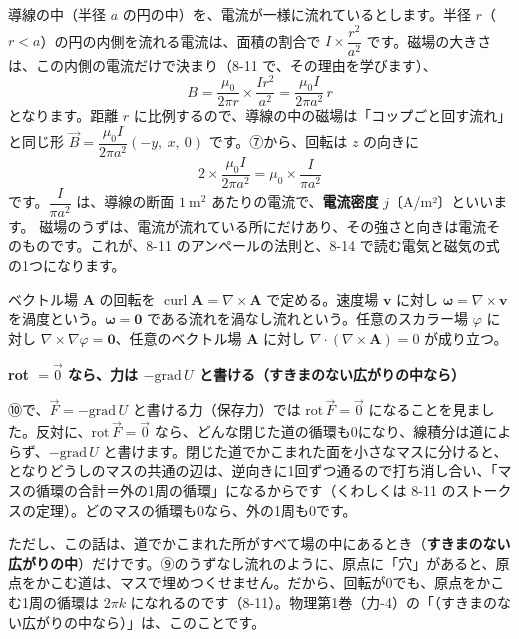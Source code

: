 導線の中（半径 $a$ の円の中）を、電流が一様に流れているとします。半径 $r$（$r<a$）の円の内側を流れる電流は、面積の割合で $I\times\dfrac{r^2}{a^2}$ です。磁場の大きさは、この内側の電流だけで決まり（8-11 で、その理由を学びます）、
\[ B=\frac{\mu_0}{2\pi r}\times\frac{Ir^2}{a^2}=\frac{\mu_0I}{2\pi a^2}\,r \]
となります。距離 $r$ に比例するので、導線の中の磁場は「コップごと回す流れ」と同じ形 $\vec B=\dfrac{\mu_0I}{2\pi a^2}(-y,\ x,\ 0)$ です。⑦から、回転は $z$ の向きに
\[ 2\times\frac{\mu_0I}{2\pi a^2}=\mu_0\times\frac{I}{\pi a^2} \]
です。$\dfrac{I}{\pi a^2}$ は、導線の断面 $1\ \text{m}^2$ あたりの電流で、\textbf{電流密度} $j$〔A/m²〕といいます。
磁場のうずは、電流が流れている所にだけあり、その強さと向きは電流そのものです。これが、8-11 のアンペールの法則と、8-14 で読む電気と磁気の式の1つになります。

\begin{senmonsho}
\begin{bkhonbun}
ベクトル場 $\symbf A$ の回転を $\operatorname{curl}\symbf A=\nabla\times\symbf A$ で定める。速度場 $\symbf v$ に対し $\symbf\omega=\nabla\times\symbf v$ を渦度という。$\symbf\omega=\symbf0$ である流れを渦なし流れという。任意のスカラー場 $\varphi$ に対し $\nabla\times\nabla\varphi=\symbf0$、任意のベクトル場 $\symbf A$ に対し $\nabla\cdot(\nabla\times\symbf A)=0$ が成り立つ。
\end{bkhonbun}
\end{senmonsho}

\begin{motto}[5]
\textbf{rot $=\vec0$ なら、力は $-\mathrm{grad}\,U$ と書ける（すきまのない広がりの中なら）}\par
⑩で、$\vec F=-\mathrm{grad}\,U$ と書ける力（保存力）では $\mathrm{rot}\,\vec F=\vec0$ になることを見ました。反対に、$\mathrm{rot}\,\vec F=\vec0$ なら、どんな閉じた道の循環も0になり、線積分は道によらず、$-\mathrm{grad}\,U$ と書けます。閉じた道でかこまれた面を小さなマスに分けると、となりどうしのマスの共通の辺は、逆向きに1回ずつ通るので打ち消し合い、「マスの循環の合計＝外の1周の循環」になるからです（くわしくは 8-11 のストークスの定理）。どのマスの循環も0なら、外の1周も0です。\par\vspace{2pt}
ただし、この話は、道でかこまれた所がすべて場の中にあるとき（\textbf{すきまのない広がりの中}）だけです。⑨のうずなし流れのように、原点に「穴」があると、原点をかこむ道は、マスで埋めつくせません。だから、回転が0でも、原点をかこむ1周の循環は $2\pi k$ になれるのです（8-11）。物理第1巻（力-4）の「（すきまのない広がりの中なら）」は、このことです。
\end{motto}



